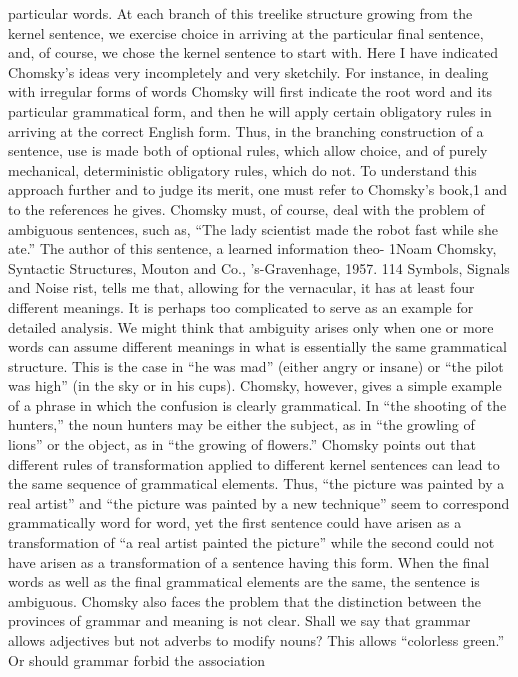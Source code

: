 {{{particular words. At each branch of this treelike structure growing
from the kernel sentence, we exercise choice in arriving at the
particular final sentence, and, of course, we chose the kernel sentence
to start with.
Here I have indicated Chomsky’s ideas very incompletely and
very sketchily. For instance, in dealing with irregular forms of
words Chomsky will first indicate the root word and its particular
grammatical form, and then he will apply certain obligatory rules
in arriving at the correct English form. Thus, in the branching construction
of a sentence, use is made both of optional rules, which
allow choice, and of purely mechanical, deterministic obligatory
rules, which do not.
To understand this approach further and to judge its merit, one
must refer to Chomsky’s book,1 and to the references he gives.
Chomsky must, of course, deal with the problem of ambiguous
sentences, such as, “The lady scientist made the robot fast while
she ate.” The author of this sentence, a learned information theo-
1Noam Chomsky, Syntactic Structures, Mouton and Co., ’s-Gravenhage, 1957.
114 Symbols, Signals and Noise
rist, tells me that, allowing for the vernacular, it has at least four
different meanings. It is perhaps too complicated to serve as an
example for detailed analysis.
We might think that ambiguity arises only when one or more
words can assume different meanings in what is essentially the same
grammatical structure. This is the case in “he was mad” (either
angry or insane) or “the pilot was high” (in the sky or in his cups).
Chomsky, however, gives a simple example of a phrase in which
the confusion is clearly grammatical. In “the shooting of the
hunters,” the noun hunters may be either the subject, as in “the
growling of lions” or the object, as in “the growing of flowers.”
Chomsky points out that different rules of transformation applied
to different kernel sentences can lead to the same sequence of
grammatical elements. Thus, “the picture was painted by a real
artist” and “the picture was painted by a new technique” seem to
correspond grammatically word for word, yet the first sentence
could have arisen as a transformation of “a real artist painted the
picture” while the second could not have arisen as a transformation
of a sentence having this form. When the final words as well
as the final grammatical elements are the same, the sentence is
ambiguous.
Chomsky also faces the problem that the distinction between
the provinces of grammar and meaning is not clear. Shall we say
that grammar allows adjectives but not adverbs to modify nouns?
This allows “colorless green.” Or should grammar forbid the association
}}}
